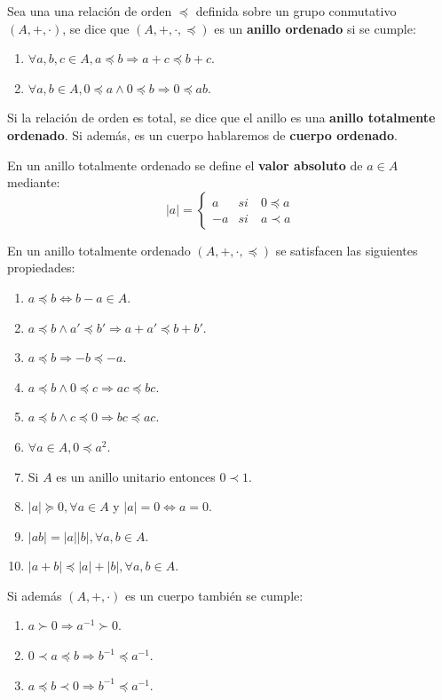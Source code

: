 Sea una una relación de orden $\preceq$ definida sobre un grupo conmutativo $(A,+,\cdot)$, se dice que $(A,+,\cdot,\preceq)$ es un \textbf{anillo ordenado} si se cumple:
\begin{enumerate}
  \item $\forall a,b,c \in A, a \preceq b \Rightarrow a+c \preceq b+c$.
  \item $\forall a,b \in A, 0 \preceq a \wedge 0 \preceq b \Rightarrow 0 \preceq ab$.
\end{enumerate}

Si la relación de orden es total, se dice que el anillo es una \textbf{anillo totalmente ordenado}. Si además, es un cuerpo hablaremos de \textbf{cuerpo ordenado}.

En un anillo totalmente ordenado se define el \textbf{valor absoluto} de $a \in A$ mediante:
\[
|a|=\begin{cases}
a &si \quad 0 \preceq a \\
-a & si \quad a \prec a
\end{cases}
\]

En un anillo totalmente ordenado $(A,+,\cdot,\preceq)$ se satisfacen las siguientes propiedades:
\begin{enumerate}
	\item $a \preceq b \Leftrightarrow b-a \in A$.
	\item $a \preceq b \wedge a' \preceq b' \Rightarrow a+a' \preceq b+b'$.
	\item $a \preceq b \Rightarrow -b \preceq -a$.
	\item $a \preceq b \wedge 0 \preceq c \Rightarrow ac \preceq bc$.
	\item $a \preceq b \wedge c \preceq 0 \Rightarrow bc \preceq ac$.
	\item $\forall a \in A, 0 \preceq a^2$.
	\item Si $A$ es un anillo unitario entonces $0 \prec 1$.
	\item $|a| \succeq 0, \forall a \in A$ y $|a| = 0 \Leftrightarrow a=0$.
	\item $|ab|=|a||b|, \forall a,b \in A$.
	\item $|a+b| \preceq |a|+|b|, \forall a,b \in A$.
\end{enumerate}

Si además $(A,+,\cdot)$ es un cuerpo también se cumple:
\begin{enumerate}
	\item $a \succ 0 \Rightarrow a^{-1} \succ 0$.
	\item $0 \prec a \preceq b \Rightarrow b^{-1} \preceq a^{-1}$.
	\item $a \preceq b \prec 0 \Rightarrow b^{-1} \preceq a^{-1}$.
\end{enumerate}

